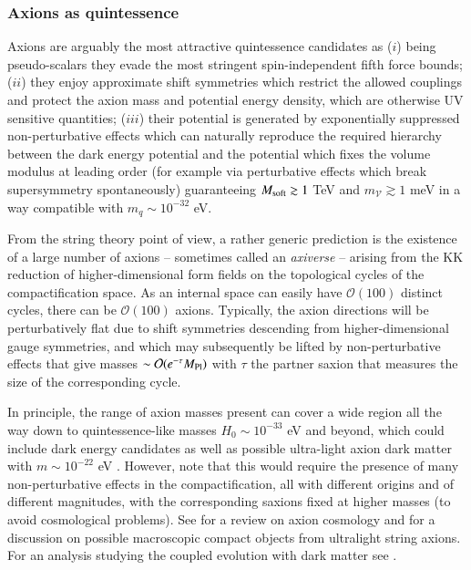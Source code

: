 \subsubsection{Axions as quintessence}

Axions are arguably the most attractive quintessence candidates \cite{Kaloper:2008qs, Panda:2010uq, Choi:1999xn,Cicoli:2021skd} as ($i$) being pseudo-scalars they evade the most stringent spin-independent fifth force bounds; ($ii$) they enjoy approximate shift symmetries which restrict the allowed couplings and protect the axion mass and potential energy density, which are otherwise UV sensitive quantities; ($iii$) their potential is generated by exponentially suppressed non-perturbative effects which can naturally reproduce the required hierarchy between the dark energy potential and the potential which fixes the volume modulus at leading order (for example via perturbative effects which break supersymmetry spontaneously) guaranteeing $M_{\rm soft}\gtrsim 1$ TeV and $m_{\mathcal{V}}\gtrsim 1$ meV in a way compatible with $m_q \sim 10^{-32}$ eV. 

From the string theory point of view, a rather generic prediction is the existence of a 
large number of axions \cite{Green:1987mn, Banks:1996ea, Banks:2002sd, Svrcek:2006yi, Conlon:2006tq}  -- sometimes called an \emph{axiverse} \cite{Arvanitaki:2009fg} -- arising from the KK reduction of higher-dimensional form fields on the topological cycles of the compactification space. As an internal space can easily have $\mathcal{O}(100)$ distinct cycles, there can be $\mathcal{O}(100)$ axions. Typically, the axion directions will be perturbatively flat due to shift symmetries descending from higher-dimensional gauge symmetries, and which may subsequently be lifted by non-perturbative effects that give masses $\sim \mathcal{O}(e^{-\tau}M_{\rm Pl})$ with $\tau$ the partner saxion that measures the size of the corresponding cycle. 

In principle, the range of axion masses present can cover a wide region all the way down to quintessence-like masses $H_0 \sim 10^{-33}$ eV and beyond, which could include dark energy candidates as well as possible ultra-light axion dark matter with $m \sim 10^{-22}$ eV \cite{Hui:2016ltb, Cicoli:2021gss}. However, note that this would require the presence of many non-perturbative effects in the compactification, all with different origins and of different magnitudes, with the corresponding saxions fixed at higher masses (to avoid cosmological problems). See \cite{Marsh:2015xka} for a review on axion cosmology and \cite{Krippendorf:2018tei} for a discussion on possible macroscopic compact objects from ultralight string axions. For an analysis studying the coupled evolution with dark matter see \cite{Kumar:2013oda}.

